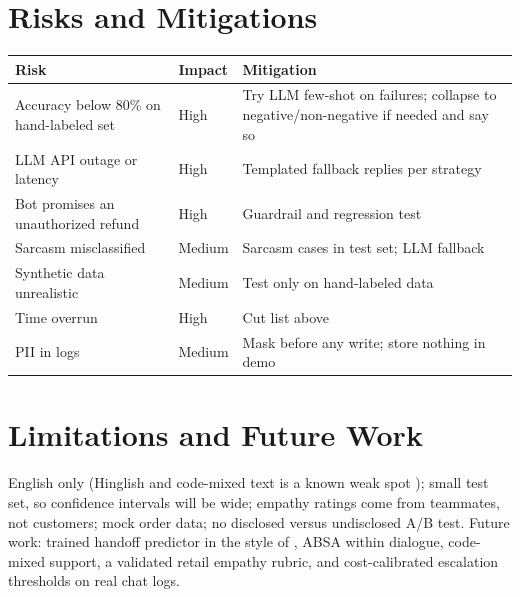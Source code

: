 \documentclass[11pt,a4paper]{article}
\begin{document}
\section{Risks and Mitigations}
\begin{center}
\begin{tabular}{@{}p{4.6cm}p{2cm}p{7.4cm}@{}}
\toprule
\textbf{Risk} & \textbf{Impact} & \textbf{Mitigation}\\
\midrule
Accuracy below 80\% on hand-labeled set & High & Try LLM few-shot on failures; collapse to negative/non-negative if needed and say so\\
LLM API outage or latency & High & Templated fallback replies per strategy\\
Bot promises an unauthorized refund & High & Guardrail and regression test\\
Sarcasm misclassified & Medium & Sarcasm cases in test set; LLM fallback\\
Synthetic data unrealistic & Medium & Test only on hand-labeled data\\
Time overrun & High & Cut list above\\
PII in logs & Medium & Mask before any write; store nothing in demo\\
\bottomrule
\end{tabular}
\end{center}

\section{Limitations and Future Work}
English only (Hinglish and code-mixed text is a known weak spot \cite{patwa2020}); small test set, so confidence intervals will be wide; empathy ratings come from teammates, not customers; mock order data; no disclosed versus undisclosed A/B test. Future work: trained handoff predictor in the style of \cite{liu2021handoff}, ABSA within dialogue, code-mixed support, a validated retail empathy rubric, and cost-calibrated escalation thresholds on real chat logs.
\end{document}

